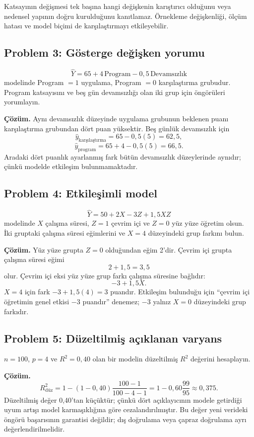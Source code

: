 Katsayının değişmesi tek başına hangi değişkenin karıştırıcı olduğunu veya
nedensel yapının doğru kurulduğunu kanıtlamaz. Örnekleme değişkenliği,
ölçüm hatası ve model biçimi de karşılaştırmayı etkileyebilir.

\subsection*{Problem 3: Gösterge değişken yorumu}

\[
\hat Y=65+4\,\text{Program}-0{,}5\,\text{Devamsızlık}
\]
modelinde Program $=1$ uygulama, Program $=0$ karşılaştırma grubudur. Program
katsayısını ve beş gün devamsızlığı olan iki grup için öngörüleri yorumlayın.

\textbf{Çözüm.} Aynı devamsızlık düzeyinde uygulama grubunun beklenen puanı
karşılaştırma grubundan dört puan yüksektir. Beş günlük devamsızlık için
\[
\hat y_{\text{karşılaştırma}}=65-0{,}5(5)=62{,}5,
\]
\[
\hat y_{\mathrm{program}}=65+4-0{,}5(5)=66{,}5.
\]
Aradaki dört puanlık ayarlanmış fark bütün devamsızlık düzeylerinde aynıdır;
çünkü modelde etkileşim bulunmamaktadır.

\subsection*{Problem 4: Etkileşimli model}

\[
\hat Y=50+2X-3Z+1{,}5XZ
\]
modelinde $X$ çalışma süresi, $Z=1$ çevrim içi ve $Z=0$ yüz yüze öğretim
olsun. İki gruptaki çalışma süresi eğimlerini ve $X=4$ düzeyindeki grup
farkını bulun.

\textbf{Çözüm.} Yüz yüze grupta $Z=0$ olduğundan eğim 2'dir. Çevrim içi
grupta çalışma süresi eğimi
\[
2+1{,}5=3{,}5
\]
olur. Çevrim içi eksi yüz yüze grup farkı çalışma süresine bağlıdır:
\[
-3+1{,}5X.
\]
$X=4$ için fark $-3+1{,}5(4)=3$ puandır. Etkileşim bulunduğu için ``çevrim
içi öğretimin genel etkisi $-3$ puandır'' denemez; $-3$ yalnız $X=0$
düzeyindeki grup farkıdır.

\subsection*{Problem 5: Düzeltilmiş açıklanan varyans}

$n=100$, $p=4$ ve $R^2=0{,}40$ olan bir modelin düzeltilmiş $R^2$ değerini
hesaplayın.

\textbf{Çözüm.}
\[
R^2_{\mathrm{düz}}
=1-(1-0{,}40)\frac{100-1}{100-4-1}
=1-0{,}60\frac{99}{95}
\approx0{,}375.
\]
Düzeltilmiş değer 0,40'tan küçüktür; çünkü dört açıklayıcının modele getirdiği
uyum artışı model karmaşıklığına göre cezalandırılmıştır. Bu değer yeni
verideki öngörü başarısının garantisi değildir; dış doğrulama veya çapraz
doğrulama ayrı değerlendirilmelidir.

